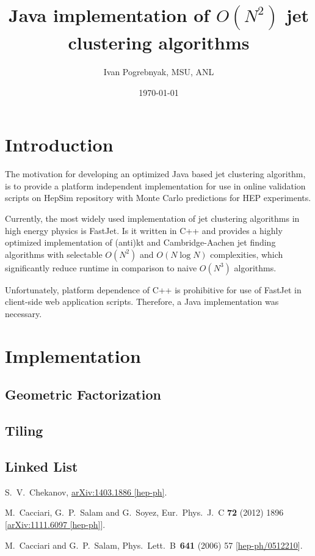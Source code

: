\documentclass[12pt]{article}
\title{Java implementation of $O(N^2)$ jet clustering algorithms}
\author{Ivan Pogrebnyak, MSU, ANL}
\date{\today}
\begin{document}


\section{Introduction}
The motivation for developing an optimized Java based jet clustering algorithm, is to provide a platform independent implementation for use in online validation scripts on HepSim\cite{HepSim} repository with Monte Carlo predictions for HEP experiments.

Currently, the most widely used implementation of jet clustering algorithms in high energy physics is FastJet\cite{fastjet_man}. Is it written in C++ and provides a highly optimized implementation of (anti)kt and Cambridge-Aachen jet finding algorithms with selectable $O(N^2)$ and $O(N\log N)$ complexities, which significantly reduce runtime in comparison to naive $O(N^3)$ algorithms\cite{fastjet_n3}.

Unfortunately, platform dependence of C++ is prohibitive for use of FastJet in client-side web application  scripts. Therefore, a Java implementation was necessary.

\section{Implementation}




\subsection{Geometric Factorization}


\subsection{Tiling}


\subsection{Linked List}


\begin{thebibliography}{9}
  
  S.~V.~Chekanov,
  \href{http://arxiv.org/abs/1403.1886}{arXiv:1403.1886 [hep-ph]}.

  M.~Cacciari, G.~P.~Salam and G.~Soyez,
  Eur.\ Phys.\ J.\ C {\bf 72} (2012) 1896
  [\href{http://arxiv.org/abs/1111.6097}{arXiv:1111.6097 [hep-ph]}].

  M.~Cacciari and G.~P.~Salam,
  Phys.\ Lett.\ B\ {\bf 641} (2006) 57
  [\href{http://arxiv.org/abs/hep-ph/0512210}{hep-ph/0512210}].

\end{thebibliography}
\end{document}
